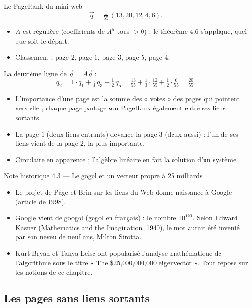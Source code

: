 \begin{frame}{Le PageRank du mini-web}
  \small
  \[
    \vec q = \tfrac1{55}\,(13, 20, 12, 4, 6).
  \]
  \begin{itemize}
    \item $A$ est régulière (coefficients de $A^5$ tous $>0$) : le
      théorème 4.6 s'applique, quel que soit le départ.
    \item Classement : page $2$, page $1$, page $3$, page $5$, page $4$.
  \end{itemize}
  La deuxième ligne de $\vec q=A\vec q$ :
  \[
    q_2 = 1\cdot q_1+\tfrac13\,q_3+\tfrac12\,q_5
    = \tfrac{13}{55}+\tfrac13\cdot\tfrac{12}{55}+\tfrac12\cdot\tfrac6{55}
    = \tfrac{20}{55}.
  \]
  \begin{itemize}
    \item L'importance d'une page est la somme des « votes » des pages qui
      pointent vers elle ; chaque page partage son PageRank également
      entre ses liens sortants.
    \item La page $1$ (deux liens entrants) devance la page $3$ (deux
      aussi) : l'un de ses liens vient de la page $2$, la plus importante.
    \item Circulaire en apparence ; l'algèbre linéaire en fait la solution
      d'un système.
  \end{itemize}
\end{frame}

\begin{frame}{Note historique 4.3 --- Le gogol et un vecteur propre à 25 milliards}
  \small
  \begin{itemize}
    \item Le projet de Page et Brin sur les liens du Web donne naissance à
      Google (article de 1998).
    \item Google vient de googol (gogol en français) : le nombre
      $10^{100}$. Selon Edward Kasner (Mathematics and the Imagination,
      1940), le mot aurait été inventé par son neveu de neuf ans, Milton
      Sirotta.
    \item Kurt Bryan et Tanya Leise ont popularisé l'analyse mathématique
      de l'algorithme sous le titre « The \$25,000,000,000 eigenvector ».
      Tout repose sur les notions de ce chapitre.
  \end{itemize}
\end{frame}

\subsection{Les pages sans liens sortants}

